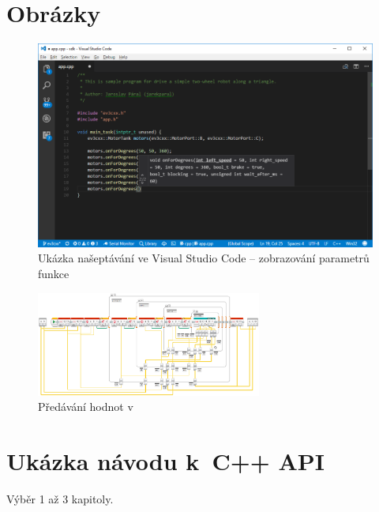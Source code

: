 \chapter{Obrázky}


\begin{figure}[h]
    \centering
    \includegraphics[width=\textwidth]{images/visual-studio-code_intellisense-param.png}
    \caption{Ukázka našeptávání ve Visual Studio Code -- zobrazování parametrů funkce}
    \label{fig:visual-studio-code_intellisense-param}
\end{figure}


\begin{figure}[h]
	\centering
	\includegraphics[angle=-90,origin=c,width=280px]{images/lego-soft_legolib_match_array_length.png}
	\caption[Předávání hodnot v~\legoSW{}]{Předávání hodnot v~\legoSW{}}
	\label{fig:lego-soft_legolib_match_array_length}
\end{figure}



\chapter{Ukázka návodu k~C++ API}

Výběr 1 až 3 kapitoly.



















